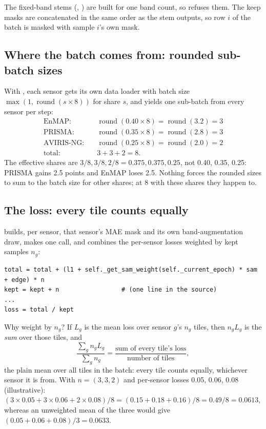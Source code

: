 
The fixed-band stems (, ) are built for one band count, so  refuses them. The keep masks are concatenated in the
same order as the stem outputs, so row $i$ of the batch is masked with sample $i$'s own mask.

\subsection{Where the batch comes from: rounded sub-batch sizes}

With , each sensor gets its own data loader with batch size $\max(1, \operatorname{round}(s \times 8))$ for share $s$, and
 yields one sub-batch from every sensor per step:
\begin{align*}
  \text{EnMAP:}&\quad \operatorname{round}(0.40 \times 8) = \operatorname{round}(3.2) = 3\\
  \text{PRISMA:}&\quad \operatorname{round}(0.35 \times 8) = \operatorname{round}(2.8) = 3\\
  \text{AVIRIS-NG:}&\quad \operatorname{round}(0.25 \times 8) = \operatorname{round}(2.0) = 2\\
  \text{total:}&\quad 3 + 3 + 2 = 8.
\end{align*}
The effective shares are $3/8, 3/8, 2/8 = 0.375, 0.375, 0.25$, not 0.40, 0.35, 0.25: PRISMA gains 2.5 points and EnMAP loses 2.5. Nothing forces the rounded
sizes to sum to the batch size for other shares; at 8 with these shares they happen to.

\subsection{The loss: every tile counts equally}

 builds, per sensor, that sensor's MAE mask and its own band-augmentation draw, makes one  call, and combines the
per-sensor losses weighted by kept samples $n_g$:
\begin{lstlisting}
total = total + (l1 + self._get_sam_weight(self._current_epoch) * sam + edge) * n
kept = kept + n                 # (one line in the source)
...
loss = total / kept
\end{lstlisting}
Why weight by $n_g$? If $L_g$ is the mean loss over sensor $g$'s $n_g$ tiles, then $n_g L_g$ is the \emph{sum} over those tiles, and
\[
  \frac{\sum_g n_g L_g}{\sum_g n_g} = \frac{\text{sum of every tile's loss}}{\text{number of tiles}},
\]
the plain mean over all tiles in the batch: every tile counts equally, whichever sensor it is from. With $n = (3, 3, 2)$ and per-sensor losses 0.05, 0.06,
0.08 (illustrative\tbrk\tagA): $(3 \times 0.05 + 3 \times 0.06 + 2 \times 0.08)/8 = (0.15 + 0.18 + 0.16)/8 = 0.49/8 = 0.0613$, whereas an unweighted mean of
the three would give $(0.05 + 0.06 + 0.08)/3 = 0.0633$.

